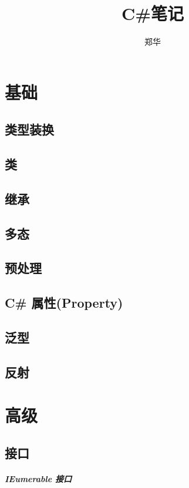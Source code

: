 \documentclass[UTF8,a4paper,12pt]{ctexbook}
\author{\kaishu 郑华}
\title{\heiti C\#笔记}
\begin{document}
 	\maketitle

\chapter{基础}
	\section{类型装换}

	\section{类}
	
	\section{继承}
	
	\section{多态}
	
	\section{预处理}
	
	\section{C\# 属性(Property)}
	
	\section{泛型}
	
	\section{反射}
	
\chapter{高级}
	\section{接口}
		
		\paragraph{IEumerable 接口}
		
\end{document}
